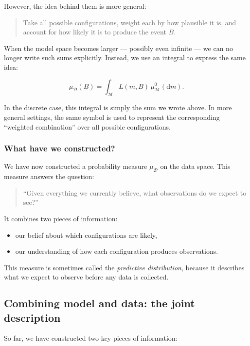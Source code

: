 \documentclass[11pt]{article}
\theoremstyle{remark}
\newcommand{\modelspace}{\mathcal{M}}
\newcommand{\dataspace}{\mathcal{D}}
\begin{document}
However, the idea behind them is more general:

\begin{quote}
Take all possible configurations, weight each by how plausible it is, and account for how likely it is to produce the event \(B\).
\end{quote}

When the model space becomes larger --- possibly even infinite --- we can no longer write such sums explicitly. Instead, we use an integral to express the same idea:

\[
\mu_{\dataspace}(B)
=
\int_{\modelspace}
L(m,B)\,\mu_{\modelspace}^0(\mathrm dm).
\]

\vspace{2mm}

In the discrete case, this integral is simply the sum we wrote above. In more general settings, the same symbol is used to represent the corresponding ``weighted combination'' over all possible configurations.

\subsubsection{What have we constructed?}

We have now constructed a probability measure \(\mu_{\dataspace}\) on the data space. This measure answers the question:

\begin{quote}
``Given everything we currently believe, what observations do we expect to see?''
\end{quote}

It combines two pieces of information:

\begin{itemize}
    \item our belief about which configurations are likely,
    \item our understanding of how each configuration produces observations.
\end{itemize}

This measure is sometimes called the \emph{predictive distribution}, because it describes what we expect to observe before any data is collected.


\subsection{Combining model and data: the joint description}

So far, we have constructed two key pieces of information:
\end{document}
